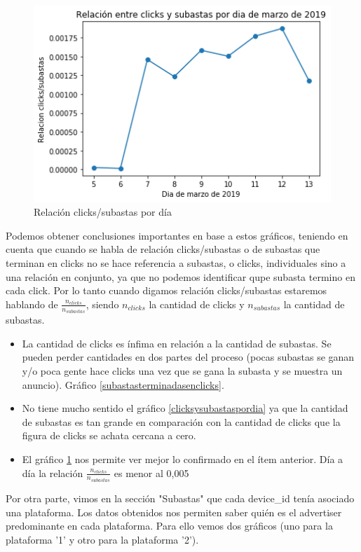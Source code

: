 \documentclass[a4paper, 12pt]{article}
\newcommand\tab[1][1cm]{\hspace*{#1}}
\begin{document}
		\begin{figure}[h]
			\centering
			\includegraphics[width=350pt]{images/auctions-clicks/relauctionsclickspordia.png}
			\caption{Relación clicks/subastas por día}
			\label{relclickssubastas}
		\end{figure}
	\FloatBarrier

	\tab Podemos obtener conclusiones importantes en base a estos gráficos, teniendo en cuenta que cuando se habla de relación clicks/subastas o de subastas que terminan en clicks no se hace referencia a subastas, o clicks, individuales sino a una relación en conjunto, ya que no podemos identificar qupe subasta termino en cada click. Por lo tanto cuando digamos relación clicks/subastas estaremos hablando de $\frac{n_{clicks}}{n_{subastas}}$, siendo $n_{clicks}$ la cantidad de clicks y $n_{subastas}$ la cantidad de subastas.
	\begin{itemize}
		\item La cantidad de clicks es ínfima en relación a la cantidad de subastas. Se pueden perder cantidades en dos partes del proceso (pocas subastas se ganan  y/o poca gente hace clicks una vez que se gana la subasta y se muestra un anuncio). Gráfico \ref{subastasterminadasenclicks}.
		\item No tiene mucho sentido el gráfico \ref{clicksysubastaspordia} ya que la cantidad de subastas es tan grande en comparación con la cantidad de clicks que la figura de clicks se achata cercana a cero.
		\item El gráfico \ref{relclickssubastas} nos permite ver mejor lo confirmado en el ítem anterior. Día a día la relación $\frac{n_{clicks}}{n_{subastas}}$ es menor al 0,005%
	\end{itemize}

	\tab Por otra parte, vimos en la sección "Subastas" que cada device\_id tenía asociado una plataforma. Los datos obtenidos nos permiten saber quién es el advertiser predominante en cada plataforma. Para ello vemos dos gráficos (uno para la plataforma '1' y otro para la plataforma '2').
\end{document}
